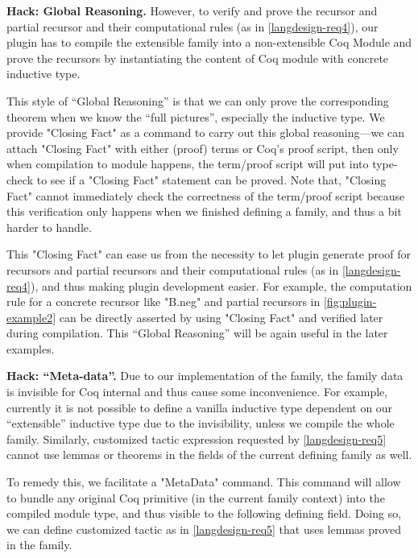 
\textbf{Hack: Global Reasoning.}
However, to verify and prove the recursor and partial recursor and their computational rules (as in \ref{langdesign-req4}), our plugin has to compile the extensible family into a non-extensible Coq Module and prove the recursors by instantiating the content of Coq module with concrete inductive type.  

This style of ``Global Reasoning'' is that we can only prove the corresponding theorem when we know the ``full pictures'', especially the inductive type. We provide "Closing Fact" as a command to carry out this global reasoning---we can attach "Closing Fact" with either (proof) terms or Coq's proof script, then only when compilation to module happens, the term/proof script will put into type-check to see if a "Closing Fact" statement can be proved. Note that, "Closing Fact" cannot immediately check the correctness of the term/proof script because this verification only happens when we finished defining a family, and thus a bit harder to handle.

This "Closing Fact" can ease us from the necessity to let plugin generate proof for recursors and partial recursors and their computational rules (as in \ref{langdesign-req4}), and thus making plugin development easier. For example, the computation rule for a concrete recursor like "B.neg" and partial recursors in \cref{fig:plugin-example2} can be directly asserted by using "Closing Fact" and verified later during compilation. This ``Global Reasoning'' will be again useful in the later examples.

\textbf{Hack: ``Meta-data''.} Due to our implementation of the family, the family data is invisible for Coq internal and thus cause some inconvenience.  For example, currently it is not possible to define a vanilla inductive type dependent on our ``extensible'' inductive type due to the invisibility, unless we compile the whole family. Similarly, customized tactic expression requested by \ref{langdesign-req5} cannot use lemmas or theorems in the fields of the current defining family as well.

To remedy this, we facilitate a "MetaData" command. This command will allow to bundle any original Coq primitive (in the current family context) into the compiled module type, and thus visible to the following defining field. Doing so, we can define customized tactic as in \ref{langdesign-req5} that uses lemmas proved in the family. 